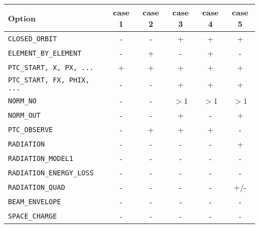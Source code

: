 \begin{tabular}{|lccccc|}
\hline 
{\bf Option} & {\bf case 1} & {\bf case 2} & {\bf case 3} & {\bf case 4} & {\bf case 5 } \\ 
\hline
{\tt CLOSED\_ORBIT} & - & - & + & + & + \\ 
\hline
{\tt ELEMENT\_BY\_ELEMENT} & - & + & - & + & - \\ 
\hline
{\tt PTC\_START, X, PX, ...} & + & + & + & + & + \\ 
\hline
{\tt PTC\_START, FX, PHIX, ...} & -  & - & + & + & + \\ 
\hline
{\tt NORM\_NO} & - & - & $>$1 & $>$1 & $>$1 \\ 
\hline
{\tt NORM\_OUT} & - & - & + & - & + \\ 
\hline
{\tt PTC\_OBSERVE} & - & + & + & + & - \\ 
\hline
{\tt RADIATION} & - & - & - & - & + \\ 
\hline
{\tt RADIATION\_MODEL1} & - & - & - & - & - \\ 
\hline
{\tt RADIATION\_ENERGY\_LOSS} & - & - & - & - & - \\ 
\hline
{\tt RADIATION\_QUAD} & - & - & - & - & +/- \\ 
\hline
{\tt BEAM\_ENVELOPE} & - & - & - & - & - \\ 
\hline
{\tt SPACE\_CHARGE} & - & - & - & - & - \\ 
\hline
\end{tabular}




